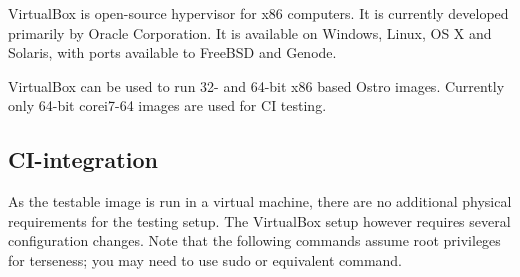 \documentclass[a4paper,11pt]{article}
\begin{document}
VirtualBox is open-source hypervisor for x86 computers. It is currently developed primarily by Oracle Corporation. It is available on Windows, Linux, OS X and Solaris, with ports available to FreeBSD and Genode.

VirtualBox can be used to run 32- and 64-bit x86 based Ostro images. Currently only 64-bit corei7-64 images are used for CI testing.

\subsection{CI-integration}

As the testable image is run in a virtual machine, there are no additional physical requirements for the testing setup. The VirtualBox setup however requires several configuration changes. Note that the following commands assume root privileges for terseness; you may need to use sudo or equivalent command.
\end{document}
